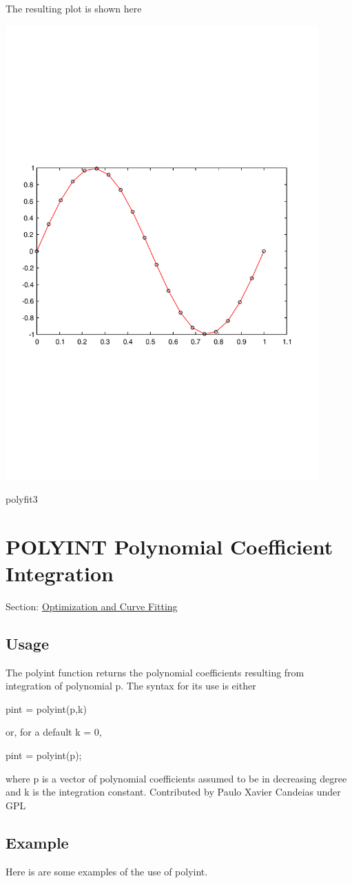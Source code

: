 The resulting plot is shown here  
\begin{DoxyImage}
\includegraphics[width=12cm]{polyfit3}
\caption{polyfit3}
\end{DoxyImage}
 \hypertarget{curvefit_polyint}{}\section{P\-O\-L\-Y\-I\-N\-T Polynomial Coefficient Integration}\label{curvefit_polyint}
Section\-: \hyperlink{sec_curvefit}{Optimization and Curve Fitting} \hypertarget{vtkwidgets_vtkxyplotwidget_Usage}{}\subsection{Usage}\label{vtkwidgets_vtkxyplotwidget_Usage}
The polyint function returns the polynomial coefficients resulting from integration of polynomial p. The syntax for its use is either \begin{DoxyVerb} pint = polyint(p,k)
\end{DoxyVerb}
 or, for a default {\ttfamily k = 0}, \begin{DoxyVerb} pint = polyint(p);
\end{DoxyVerb}
 where {\ttfamily p} is a vector of polynomial coefficients assumed to be in decreasing degree and {\ttfamily k} is the integration constant. Contributed by Paulo Xavier Candeias under G\-P\-L \hypertarget{variables_struct_Example}{}\subsection{Example}\label{variables_struct_Example}
Here is are some examples of the use of {\ttfamily polyint}.


